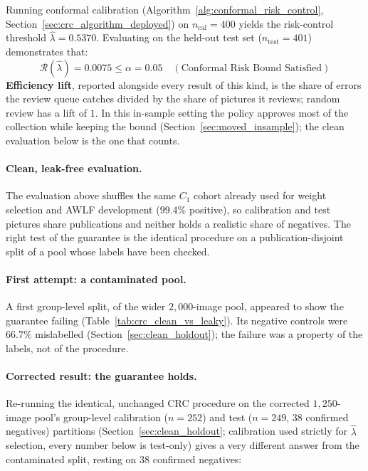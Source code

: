 \documentclass[12pt,a4paper]{report}
\begin{document}
Running conformal calibration (Algorithm~\ref{alg:conformal_risk_control}, Section~\ref{sec:crc_algorithm_deployed}) on $n_{\text{cal}}=400$ yields the risk-control threshold $\hat{\lambda} = 0.5370$. Evaluating on the held-out test set ($n_{\text{test}}=401$) demonstrates that:
\begin{equation}
    \mathcal{R}(\hat{\lambda}) = \mathbf{0.0075} \le \alpha = 0.05 \quad (\text{Conformal Risk Bound Satisfied})
\end{equation}
\textbf{Efficiency lift}, reported alongside every result of this kind, is the share of errors the review queue catches divided by the share of pictures it reviews; random review has a lift of $1$. In this in-sample setting the policy approves most of the collection while keeping the bound (Section~\ref{sec:moved_insample}); the clean evaluation below is the one that counts.

\paragraph{Clean, leak-free evaluation.} The evaluation above shuffles the same $C_1$ cohort already used for weight selection and AWLF development ($99.4\%$ positive), so calibration and test pictures share publications and neither holds a realistic share of negatives. The right test of the guarantee is the identical procedure on a publication-disjoint split of a pool whose labels have been checked.

\paragraph{First attempt: a contaminated pool.} A first group-level split, of the wider $2{,}000$-image pool, appeared to show the guarantee failing (Table~\ref{tab:crc_clean_vs_leaky}). Its negative controls were $66.7\%$ mislabelled (Section~\ref{sec:clean_holdout}); the failure was a property of the labels, not of the procedure.

\paragraph{Corrected result: the guarantee holds.} Re-running the identical, unchanged CRC procedure on the corrected $1{,}250$-image pool's group-level calibration ($n=252$) and test ($n=249$, $38$ confirmed negatives) partitions (Section~\ref{sec:clean_holdout}; calibration used strictly for $\hat\lambda$ selection, every number below is test-only) gives a very different answer from the contaminated split, resting on $38$ confirmed negatives:
\end{document}
